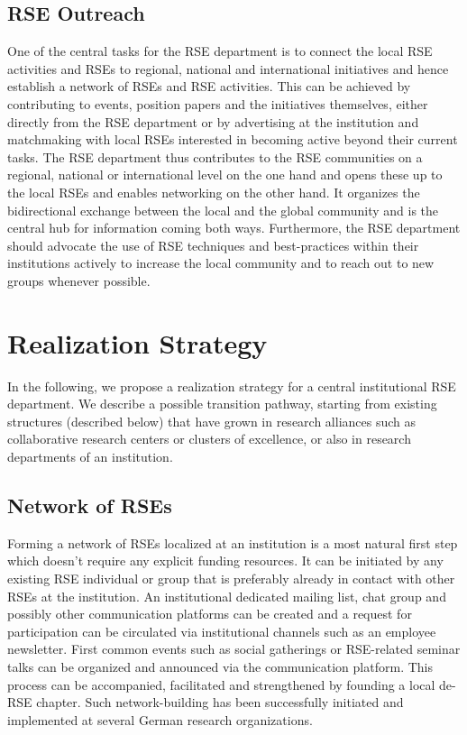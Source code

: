 \documentclass{article}
\begin{document}
\subsection{RSE Outreach}

One of the central tasks for the RSE department is to connect the local RSE activities and RSEs to regional, national and international initiatives and hence establish a network of RSEs and RSE activities.
This can be achieved by contributing to events, position papers and the initiatives themselves, either directly from the RSE department or by advertising at the institution and matchmaking with local RSEs interested in becoming active beyond their current tasks.
The RSE department thus contributes to the RSE communities on a regional, national or international level on the one hand and opens these up to the local RSEs and enables networking on the other hand. It organizes the bidirectional exchange between the local and the global community and is the central hub for information coming both ways. Furthermore, the RSE department should advocate the use of RSE techniques and best-practices within their institutions actively to increase the local community and to reach out to new groups whenever possible.

\section{Realization Strategy}

In the following, we propose a realization strategy for a central institutional RSE department.
We describe a possible transition pathway, starting from existing structures (described below) that have grown in research alliances such as collaborative research centers or clusters of excellence, or also in research departments of an institution.

\subsection{Network of RSEs}

Forming a network of RSEs localized at an institution is a most natural first step which doesn’t require any explicit funding resources.
It can be initiated by any existing RSE individual or group that is preferably already in contact with other RSEs at the institution.
An institutional dedicated mailing list, chat group and possibly other communication platforms can be created and a request for participation can be circulated via institutional channels such as an employee newsletter. First common events such as social gatherings or RSE-related seminar talks can be organized and announced via the communication platform.
This process can be accompanied, facilitated and strengthened by founding a local de-RSE chapter.
Such network-building has been successfully initiated and implemented at several German research organizations.
\end{document}
